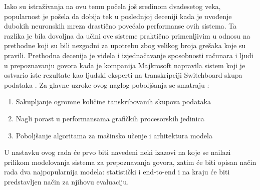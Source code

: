 \documentclass[a4paper]{article}
\begin{document}
Iako su istraživanja na ovu temu počela još sredinom dvadesetog veka, popularnost je pošela da dobija tek u poslednjoj deceniji kada je uvođenje dubokih neuronskih mreza drastično povećalo performanse ovih sistema.
Ta razlika je bila dovoljna da učini ove sisteme praktično primenljivim u odnosu na prethodne koji su bili nezgodni za upotrebu zbog velikog broja grešaka koje su pravili.
Prethodna decenija je videla i izjednačavanje sposobnosti računara i ljudi u prepoznavanju govora kada je kompanija Majkrosoft napravila sistem koji je ostvario iste rezultate kao ljudski eksperti na transkripciji Switchboard skupa podataka \cite{switchboard}.
Za glavne uzroke ovog naglog poboljšanja se smatraju \cite{hannun2021history}:
\begin{enumerate}
  \item Sakupljanje ogromne količine tanskribovanih skupova podataka
  \item Nagli porast u performansama grafičkih procesorskih jedinica
  \item Poboljšanje algoritama za mašinsko učenje i arhitektura modela
\end{enumerate}

U nastavku ovog rada će prvo biti navedeni neki izazovi na koje se nailazi prilikom modelovanja sistema za prepoznavanja govora, zatim će biti opisan način rada dva najpopularnija modela: statistički i end-to-end i na kraju će biti predstavljen način za njihovu evaluaciju.
\end{document}
